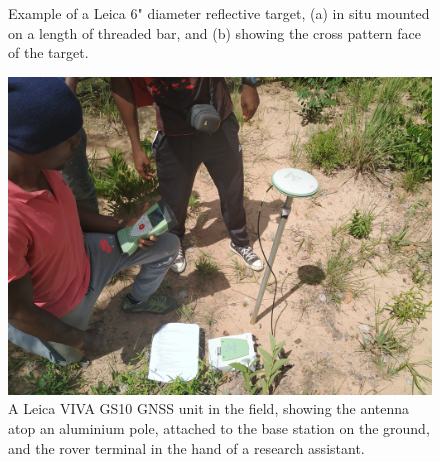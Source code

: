 \begin{refsection}
\begin{figure}
\begin{subfigure}{0.45\linewidth}
		\caption{}
		\label{workflow:target_face}
	\end{subfigure}
	\caption[Examples of reflective targets]{Example of a Leica 6" diameter reflective target, (a) in situ mounted on a length of threaded bar, and (b) showing the cross pattern face of the target.}
	\label{workflow:target}
\end{figure}

\begin{figure}
	\includegraphics[width=0.6\linewidth]{img/viva}
	\caption[Example of Leica VIVA GS10 GNSS unit]{A Leica VIVA GS10 GNSS unit in the field, showing the antenna atop an aluminium pole, attached to the base station on the ground, and the rover terminal in the hand of a research assistant.}
	\label{workflow:viva}
\end{figure}


\end{refsection}
